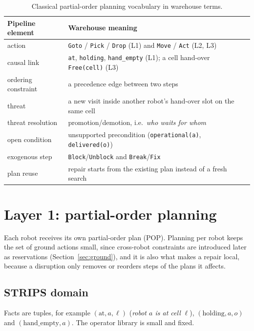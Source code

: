 \documentclass[10pt,a4paper]{article}
\newcommand{\code}[1]{\texttt{#1}}
\begin{document}
\begin{table}[H]
\centering
\small
\begin{tabularx}{\textwidth}{@{}l X@{}}
\toprule
\textbf{Pipeline element} & \textbf{Warehouse meaning} \\
\midrule
action & \code{Goto} / \code{Pick} / \code{Drop} (L1) and \code{Move} / \code{Act} (L2, L3)\\
causal link & \code{at}, \code{holding}, \code{hand\_empty} (L1); a cell hand-over \code{Free(cell)} (L3)\\
ordering constraint & a precedence edge between two steps\\
threat & a new visit inside another robot's hand-over slot on the same cell\\
threat resolution & promotion/demotion, i.e.\ \emph{who waits for whom}\\
open condition & unsupported precondition (\code{operational(a)}, \code{delivered(o)})\\
exogenous step & \code{Block}/\code{Unblock} and \code{Break}/\code{Fix}\\
plan reuse & repair starts from the existing plan instead of a fresh search\\
\bottomrule
\end{tabularx}
\caption{Classical partial-order planning vocabulary in warehouse terms.}
\label{tab:mapping}
\end{table}
\section{Layer 1: partial-order planning}\label{sec:pocl}

Each robot receives its own partial-order plan (POP).  Planning per robot
keeps the set of ground actions small, since cross-robot constraints are
introduced later as reservations (Section~\ref{sec:ground}), and it is also
what makes a repair local, because a disruption only removes or reorders
steps of the plans it affects.

\subsection{STRIPS domain}

Facts are tuples, for example $(\text{at},a,\ell)$ (\emph{robot $a$ is at
cell $\ell$}), $(\text{holding},a,o)$ and $(\text{hand\_empty},a)$.  The
operator library is small and fixed.
\end{document}
